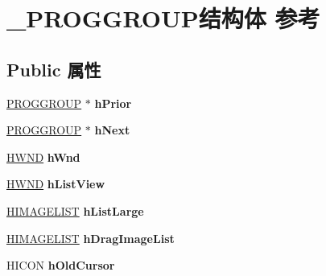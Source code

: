 \hypertarget{struct___p_r_o_g_g_r_o_u_p}{}\section{\+\_\+\+P\+R\+O\+G\+G\+R\+O\+U\+P结构体 参考}
\label{struct___p_r_o_g_g_r_o_u_p}
\subsection*{Public 属性}
\begin{DoxyCompactItemize}
\item 
\mbox{\label{struct___p_r_o_g_g_r_o_u_p_ae00e14027457cab794f1dcd24e84a504}} 
\hyperlink{struct___p_r_o_g_g_r_o_u_p}{P\+R\+O\+G\+G\+R\+O\+UP} $\ast$ {\bfseries h\+Prior}
\item 
\mbox{\label{struct___p_r_o_g_g_r_o_u_p_afaab593321126e1b7a0c8fe2e19ad3b7}} 
\hyperlink{struct___p_r_o_g_g_r_o_u_p}{P\+R\+O\+G\+G\+R\+O\+UP} $\ast$ {\bfseries h\+Next}
\item 
\mbox{\label{struct___p_r_o_g_g_r_o_u_p_ab944414fc5f213cb059f8515f5951fef}} 
\hyperlink{interfacevoid}{H\+W\+ND} {\bfseries h\+Wnd}
\item 
\mbox{\label{struct___p_r_o_g_g_r_o_u_p_ac62cf039904552b4c74ebb8aed74f1a9}} 
\hyperlink{interfacevoid}{H\+W\+ND} {\bfseries h\+List\+View}
\item 
\mbox{\label{struct___p_r_o_g_g_r_o_u_p_a8d7f696a0463d3dfbc9bb822e9b38087}} 
\hyperlink{struct___i_m_a_g_e_l_i_s_t}{H\+I\+M\+A\+G\+E\+L\+I\+ST} {\bfseries h\+List\+Large}
\item 
\mbox{\label{struct___p_r_o_g_g_r_o_u_p_a250b0a28a3e730f5daa31443cd48f85d}} 
\hyperlink{struct___i_m_a_g_e_l_i_s_t}{H\+I\+M\+A\+G\+E\+L\+I\+ST} {\bfseries h\+Drag\+Image\+List}
\item 
\mbox{\label{struct___p_r_o_g_g_r_o_u_p_a6ff1a37ea9e35e664cbcdce42304004f}} 
H\+I\+C\+ON {\bfseries h\+Old\+Cursor}
\item 
\mbox{\label{struct___p_r_o_g_g_r_o_u_p_a3fef6d7fc6dfe1a71a09d273f163721e}} 

\end{DoxyCompactItemize}
